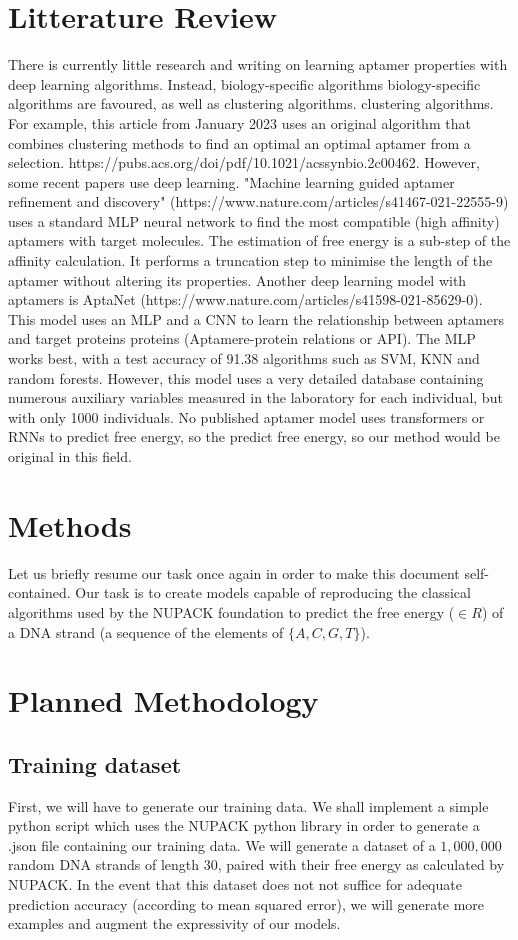 \documentclass{article}
\begin{document}
\section{Litterature Review}
There is currently little research and writing on learning 
aptamer properties with deep learning algorithms. Instead, biology-specific algorithms 
biology-specific algorithms are favoured, as well as clustering algorithms. 
clustering algorithms. For example, this article from January 2023 uses 
an original algorithm that combines clustering methods to find an optimal 
an optimal aptamer from a selection. 
https://pubs.acs.org/doi/pdf/10.1021/acssynbio.2c00462.
However, some recent papers use deep learning. 
"Machine learning guided aptamer refinement 
and discovery" (https://www.nature.com/articles/s41467-021-22555-9) 
uses a standard MLP neural network to find the most compatible (high affinity) aptamers with target molecules. The estimation of free energy is a sub-step of the affinity calculation. It performs a 
truncation step to minimise the length of the aptamer without altering its properties. 
Another deep learning model with aptamers is AptaNet 
(https://www.nature.com/articles/s41598-021-85629-0). This model uses an 
MLP and a CNN to learn the relationship between aptamers and target proteins 
proteins (Aptamere-protein relations or API). The MLP works best, with a 
test accuracy of 91.38%
algorithms such as SVM, KNN and random forests. However, this model 
uses a very detailed database containing numerous auxiliary variables 
measured in the laboratory for each individual, but with only 1000 individuals. 
No published aptamer model uses transformers or RNNs to predict free energy, so the 
predict free energy, so our method would be original in this field.

\section{Methods}
Let us briefly resume our task once again in order to make this document
self-contained. Our task is to create models capable of reproducing 
the classical algorithms used by the NUPACK foundation to predict the 
free energy ($\in R$) of a DNA strand (a sequence of the elements of $\{A,C,G,T\}$).
\section{Planned Methodology}
\subsection{Training dataset}
First, we will have to generate our training data. We shall implement a 
simple python script which uses the NUPACK python library in order
to generate a .json file containing our training data. We  
will generate a dataset of a $1,000,000$ random DNA strands of length $30$, paired with their free energy as calculated by NUPACK. In the event that this dataset does not not
suffice for adequate prediction accuracy (according to mean squared error), we will
generate more examples and augment the expressivity of our models.
\end{document}
